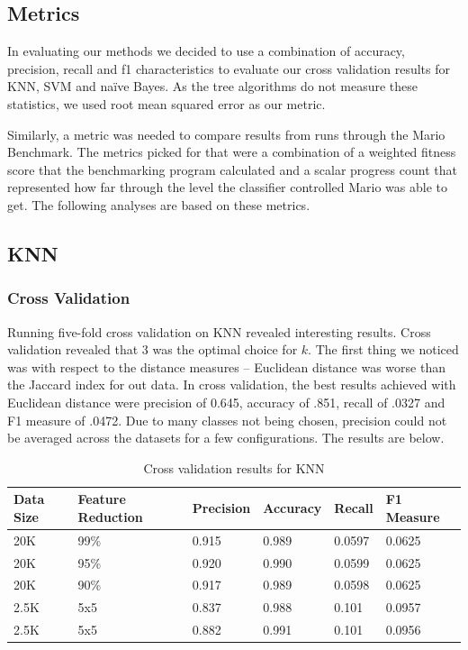 \documentclass[]{article}   %
\begin{document}
\subsection{Metrics}
In evaluating our methods we decided to use a combination of accuracy, precision, recall and f1 characteristics to 
evaluate our cross validation results for KNN, SVM and na\"{i}ve Bayes. As the tree algorithms do not measure these
statistics, we used root mean squared error as our metric.

Similarly, a metric was needed to compare results from runs through the Mario 
Benchmark. The metrics picked for that were a combination of a weighted fitness score that the benchmarking program 
calculated and a scalar progress count that represented how far through the level the classifier controlled Mario was 
able to get. The following analyses are based on these metrics.

\subsection{KNN}
\subsubsection{Cross Validation}
Running five-fold cross validation on KNN revealed interesting results. Cross validation revealed that 3 was the optimal
choice for $k$. The first thing we noticed was with respect to the distance measures -- Euclidean distance was worse than
the Jaccard index for out data. In cross validation, the best results achieved with Euclidean distance were precision of 0.645,
accuracy of .851, recall of .0327 and F1 measure of .0472. Due to many classes not being chosen, precision could not be averaged
across the datasets for a few configurations. The results are below.

\begin{table}[h!]
	\begin{center}
		\caption{Cross validation results for KNN}
		\begin{tabular}{l | l || l | l | l | l }
		Data Size & Feature Reduction & Precision & Accuracy & Recall & F1 Measure \\
		\hline
		20K & 99\% & 0.915 & 0.989 & 0.0597 & 0.0625 \\
		20K & 95\% & 0.920 & 0.990 & 0.0599 & 0.0625 \\
		20K & 90\% & 0.917 & 0.989 & 0.0598 & 0.0625 \\
		2.5K & 5x5 & 0.837 & 0.988 & 0.101 & 0.0957 \\
		2.5K & 5x5 & 0.882 & 0.991 & 0.101 & 0.0956 \\
		\hline
		\end{tabular}
	\end{center}
\end{table}
\end{document}
